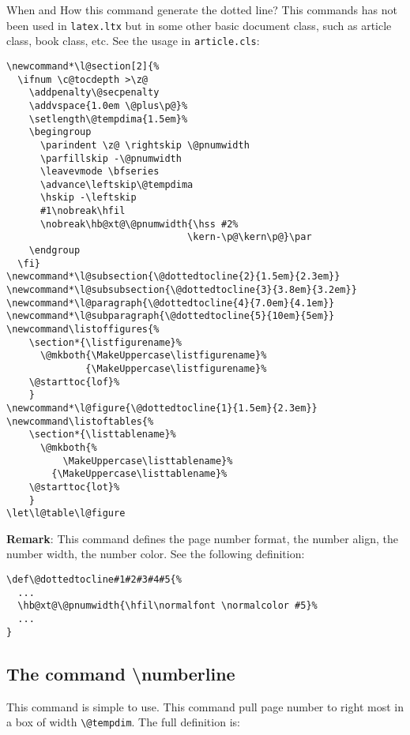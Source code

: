 \documentclass{article}
\begin{document}
When and How this command generate the dotted line? This commands has not been used in \verb|latex.ltx| but in some other basic 
document class, such as article class, book class, etc. See the usage in \verb|article.cls|:
\begin{lstlisting}
\newcommand*\l@section[2]{%
  \ifnum \c@tocdepth >\z@
    \addpenalty\@secpenalty
    \addvspace{1.0em \@plus\p@}%
    \setlength\@tempdima{1.5em}%
    \begingroup
      \parindent \z@ \rightskip \@pnumwidth
      \parfillskip -\@pnumwidth
      \leavevmode \bfseries
      \advance\leftskip\@tempdima
      \hskip -\leftskip
      #1\nobreak\hfil
      \nobreak\hb@xt@\@pnumwidth{\hss #2%
                                \kern-\p@\kern\p@}\par
    \endgroup
  \fi}
\newcommand*\l@subsection{\@dottedtocline{2}{1.5em}{2.3em}}
\newcommand*\l@subsubsection{\@dottedtocline{3}{3.8em}{3.2em}}
\newcommand*\l@paragraph{\@dottedtocline{4}{7.0em}{4.1em}}
\newcommand*\l@subparagraph{\@dottedtocline{5}{10em}{5em}}
\newcommand\listoffigures{%
    \section*{\listfigurename}%
      \@mkboth{\MakeUppercase\listfigurename}%
              {\MakeUppercase\listfigurename}%
    \@starttoc{lof}%
    }
\newcommand*\l@figure{\@dottedtocline{1}{1.5em}{2.3em}}
\newcommand\listoftables{%
    \section*{\listtablename}%
      \@mkboth{%
          \MakeUppercase\listtablename}%
        {\MakeUppercase\listtablename}%
    \@starttoc{lot}%
    }
\let\l@table\l@figure
\end{lstlisting}


\textbf{Remark}: This command defines the page number format, the number align, the number width, the number color. See the 
following definition:
\begin{lstlisting}
\def\@dottedtocline#1#2#3#4#5{%
  ...
  \hb@xt@\@pnumwidth{\hfil\normalfont \normalcolor #5}%
  ...
}
\end{lstlisting}


\subsection{The command \textbackslash numberline}
This command is simple to use. This command pull page number to right most in a box of width \verb|\@tempdim|. The 
full definition is:
\end{document}
